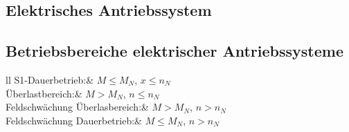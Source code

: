 \documentclass[german]{latex4ei/latex4ei_sheet}
\begin{document}
	\begin{sectionbox}
		\section{Elektrisches Antriebssystem}
		\subsection{Betriebsbereiche elektrischer Antriebssysteme}
			\begin{tablebox}{ll}
				S1-Dauerbetrieb:& $M\leq M_N$, $x\leq n_N$\\
				Überlastbereich:& $M>M_N$, $n\leq n_N$\\
				Feldschwächung Überlasbereich:& $M>M_N$, $n>n_N$\\
				Feldschwächung Dauerbetrieb:& $M\leq M_N$, $n>n_N$\\
			\end{tablebox}

	\end{sectionbox}
\end{document}
